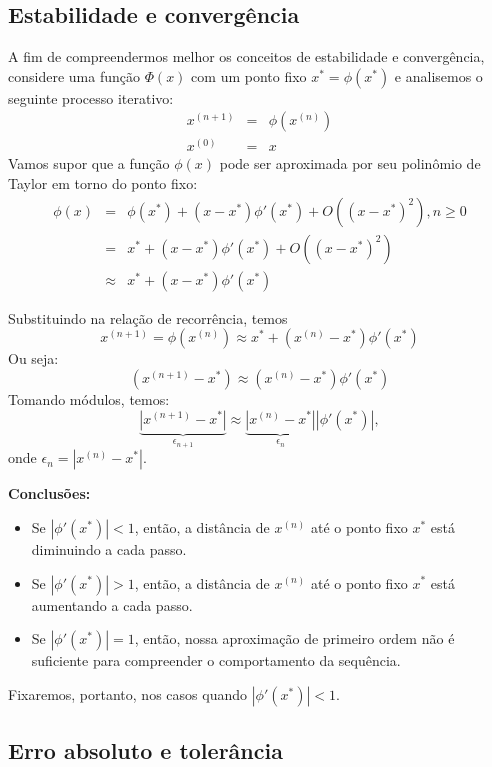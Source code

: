 \documentclass[main.tex]{subfiles}
\begin{document}
\subsection{Estabilidade e convergência}

A fim de compreendermos melhor os conceitos de estabilidade e convergência, considere uma função $\Phi(x)$ com um ponto fixo $x^*=\phi(x^*)$ e analisemos o seguinte processo iterativo:
\begin{eqnarray*}
x^{(n+1)}&=&\phi\left(x^{(n)}\right)\\
x^{(0)}&=&x
\end{eqnarray*}
Vamos supor que a função $\phi(x)$ pode ser aproximada por seu polinômio de Taylor em torno do ponto fixo:
\begin{eqnarray*}
\phi(x)&=&\phi(x^*)+(x-x^*) \phi'(x^*)+O\left((x-x^*)^2\right), n\geq 0\\
&=&x^*+(x-x^*) \phi'(x^*)+O\left((x-x^*)^2\right)\\
&\approx& x^*+(x-x^*) \phi'(x^*)
\end{eqnarray*}

Substituindo na relação de recorrência, temos
$$
x^{(n+1)}=\phi\left(x^{(n)}\right)\approx x^*+(x^{(n)}-x^*) \phi'(x^*)
$$
Ou seja:
$$
\left(x^{(n+1)}-x^*\right)\approx {(x^{(n)}-x^*)} \phi'(x^*)
$$
Tomando módulos, temos:
$$
\underbrace{\left|x^{(n+1)}-x^*\right|}_{\epsilon_{n+1}}\approx \underbrace{\left|x^{(n)}-x^*\right|}_{\epsilon_n} \left|\phi'(x^*)\right|,
$$
onde $\epsilon_n=\left|x^{(n)}-x^*\right|$.

{\bf Conclusões:}
\begin{itemize}
\item Se $|\phi'(x^*)|<1$, então, a distância de $x^{(n)}$ até o ponto fixo $x^*$ está diminuindo a cada passo.
\item Se $|\phi'(x^*)|>1$, então, a distância de $x^{(n)}$ até o ponto fixo $x^*$ está aumentando a cada passo.
\item Se $|\phi'(x^*)|=1$, então, nossa aproximação de primeiro ordem não é suficiente para compreender o comportamento da sequência.
\end{itemize}

Fixaremos, portanto, nos casos quando $|\phi'(x^*)|<1$.

\subsection{Erro absoluto e tolerância}
\end{document}
